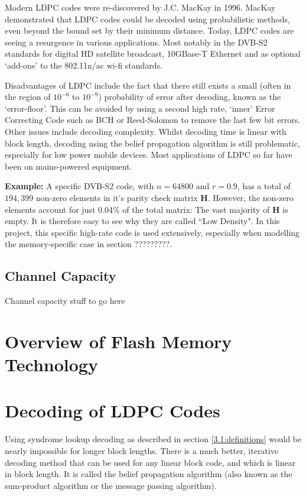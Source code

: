 \documentclass[11pt]{article}
\numberwithin{equation}{subsection}
\begin{document}
Modern LDPC codes were re-discovered by J.C. MacKay in 1996. MacKay demonstrated that LDPC codes could be decoded using probabilistic methods, even beyond the bound set by their minimum distance. Today, LDPC codes are seeing a resurgence in various applications. Most notably in the DVB-S2 standards for digital HD satellite broadcast, 10GBase-T Ethernet and as optional `add-ons' to the 802.11n/ac wi-fi standards.

Disadvantages of LDPC include the fact that there still exists a small (often in the region of $10^{-6}$ to $10^{-9}$) probability of error after decoding, known as the `error-floor'. This can be avoided by using a second high rate, `inner' Error Correcting Code such as BCH or Reed-Solomon to remove the last few bit errors. Other issues include decoding complexity. Whilst decoding time is linear with block length, decoding using the belief propagation algorithm is still problematic, especially for low power mobile devices. Most applications of LDPC so far have been on mains-powered equipment.


\textbf{Example:}
A specific DVB-S2 code, with $n = 64800$ and $r = 0.9$, has a total of $194,399$ non-zero elements in it's parity check matrix $\mathbf{H}$. However, the non-zero elements account for just 0.04\% of the total matrix: The vast majority of $\mathbf{H}$ is empty. It is therefore easy to see why they are called ``Low Density". In this project, this specific high-rate code is used extensively, especially when modelling the memory-specific case in section ?????????.

\subsection{Channel Capacity}

Channel capacity stuff to go here

\section{Overview of Flash Memory Technology} 

\section{Decoding of LDPC Codes} \label{decoding}
Using syndrome lookup decoding as described in section \ref{3.1:definitions} would be nearly impossible for longer block lengths. There is a much better, iterative decoding method that can be used for any linear block code, and which is linear in block length. It is called the belief propagation algorithm (also known as the sum-product algorithm or the message passing algorithm). 
\end{document}
